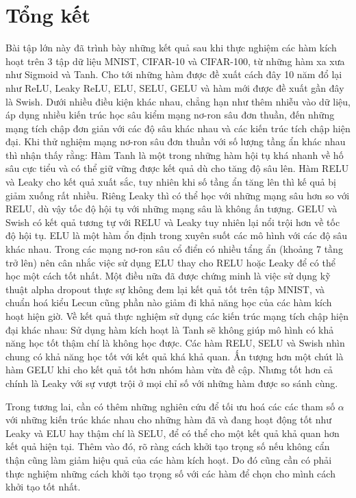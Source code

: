 \chapter{Tổng kết}\label{chap:tongket}

Bài tập lớn này đã trình bày những kết quả sau khi thực nghiệm các hàm kích hoạt trên 3 tập dữ liệu MNIST, CIFAR-10 và CIFAR-100, từ những hàm xa xưa như Sigmoid và Tanh.
Cho tới những hàm được đề xuất cách đây 10 năm đổ lại như ReLU, Leaky ReLU, ELU, SELU, GELU và hàm mới được đề xuất gần đây là Swish.
Dưới nhiều điều kiện khác nhau, chẳng hạn như thêm nhiễu vào dữ liệu, áp dụng nhiều kiến trúc học sâu kiểm mạng nơ-ron sâu đơn thuần, đến những mạng tích chập đơn giản với các độ sâu khác nhau và các kiến trúc tích chập hiện đại.
Khi thử nghiệm mạng nơ-ron sâu đơn thuần với số lượng tầng ẩn khác nhau thì nhận thấy rằng:
Hàm Tanh là một trong những hàm hội tụ khá nhanh về hố sâu cực tiểu và có thể giữ vững được kết quả dù cho tăng độ sâu lên.
Hàm RELU và Leaky cho kết quả xuất sắc, tuy nhiên khi số tầng ẩn tăng lên thì kế quả bị giảm xuống rất nhiều.
Riêng Leaky thì có thể học với những mạng sâu hơn so với RELU, dù vậy tốc độ hội tụ với những mạng sâu là không ấn tượng.
GELU và Swish có kết quả tương tự với RELU và Leaky tuy nhiên lại nổi trội hơn về tốc độ hội tụ.
ELU là một hàm ổn định trong xuyên suốt các mô hình với các độ sâu khác nhau.
Trong các mạng nơ-ron sâu cổ điển có nhiều tẩng ẩn (khoảng 7 tầng trở lên) nên cân nhắc việc sử dụng ELU thay cho RELU hoặc Leaky để có thể học một cách tốt nhất.
Một điều nữa đã được chứng minh là việc sử dụng kỹ thuật alpha dropout thực sự không đem lại kết quả tốt trên tập MNIST, và chuẩn hoá kiểu Lecun cũng phần nào giảm đi khả năng học của các hàm kích hoạt hiện giờ.
Về kết quả thực nghiệm sử dụng các kiến trúc mạng tích chập hiện đại khác nhau:
Sử dụng hàm kích hoạt là Tanh sẽ không giúp mô hình có khả năng học tốt thậm chí là không học được.
Các hàm RELU, SELU và Swish nhìn chung có khả năng học tốt với kết quả khá khả quan.
Ấn tượng hơn một chút là hàm GELU khi cho kết quả tốt hơn nhóm hàm vừa đề cập.
Nhưng tốt hơn cả chính là Leaky với sự vượt trội ở mọi chỉ số với những hàm được so sánh cùng.
\vspace{5pt}

Trong tương lai, cần có thêm những nghiên cứu để tối ưu hoá các các tham số $\alpha$ với những kiến trúc khác nhau cho những hàm đã và đang hoạt động tốt như Leaky và ELU hay thậm chí là SELU, để có thể cho một kết quả khả quan hơn kết quả hiện tại.
Thêm vào đó, rõ ràng cách khởi tạo trọng số nếu không cẩn thận cũng làm giảm hiệu quả của các hàm kích hoạt.
Do đó cũng cần có phải thực nghiệm những cách khởi tạo trọng số với các hàm để chọn cho mình cách khởi tạo tốt nhất.